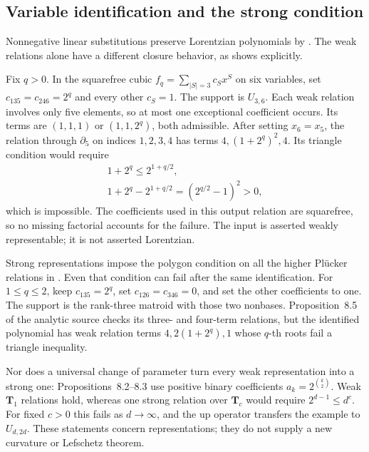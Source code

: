 \subsection{Variable identification and the strong condition}
\label{sec:appH-triangular-downward}

Nonnegative linear substitutions preserve Lorentzian
polynomials by \cite[Theorem~2.10]{BrandenHuh20Lorentzian}.
The weak relations alone have a different closure behavior,
as \cite[Proposition~8.4]{BakerHuhKummerLorscheid26AnalyticV2}
shows explicitly.

\begin{example}
\label{ex:appH-triangular-variable-identification}
Fix $q>0$. In the squarefree cubic
$f_q=\sum_{|S|=3}c_Sx^S$ on six variables, set
$c_{135}=c_{246}=2^q$ and every other $c_S=1$.
The support is $U_{3,6}$. Each weak relation involves
only five elements, so at most one exceptional coefficient
occurs. Its terms are $(1,1,1)$ or $(1,1,2^q)$, both
admissible. After setting $x_6=x_5$, the relation through
$\partial_5$ on indices $1,2,3,4$ has terms
$4,(1+2^q)^2,4$. Its triangle condition would require
\begin{equation*}
 \begin{gathered}
 1+2^q\leq2^{1+q/2},\\
 1+2^q-2^{1+q/2}=(2^{q/2}-1)^2>0,
 \end{gathered}
 \tag{H.110}\label{eq:appH-triangular-downward-failure}
\end{equation*}
which is impossible. The coefficients used in this output
relation are squarefree, so no missing factorial accounts
for the failure. The input is asserted weakly representable;
it is not asserted Lorentzian.
\end{example}

Strong representations impose the polygon condition on all
the higher Pl\"ucker relations in
\cite[Definition~4.3]{BakerHuhKimKummerLorscheid25PolymatroidsV2}.
Even that condition can fail after the same identification.
For $1\leq q\leq2$, keep $c_{135}=2^q$, set
$c_{126}=c_{346}=0$, and set the other coefficients to one.
The support is the rank-three matroid with those two
nonbases. Proposition~8.5 of the analytic source checks
its three- and four-term relations, but the identified
polynomial has weak relation terms $4,2(1+2^q),1$ whose
$q$-th roots fail a triangle inequality.

Nor does a universal change of parameter turn every weak
representation into a strong one: Propositions~8.2--8.3
use positive binary coefficients $a_k=2^{\binom{k}{2}}$.
Weak $\mathbf T_1$ relations hold, whereas one strong
relation over $\mathbf T_c$ would require
$2^{d-1}\leq d^c$. For fixed $c>0$ this fails as
$d\to\infty$, and the up operator transfers the example
to $U_{d,2d}$. These statements concern representations;
they do not supply a new curvature or Lefschetz theorem.

